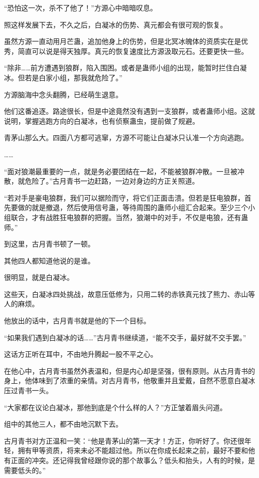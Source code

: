 \begin{this_body}
“恐怕这一次，杀不了他了！”方源心中暗暗叹息。

照这样发展下去，不久之后，白凝冰的伤势、真元都会有很可观的恢复。

虽然方源一直动用月芒蛊，追加他身上的伤势，但是北冥冰魄体的资质实在是优秀，简直可以说是得天独厚。真元的恢复速度比方源汲取元石。还要更快一些。

“除非……前方遭遇到狼群，陷入围困。或者是蛊师小组的出现，能暂时拦住白凝冰。但若是白家小组，那我就危险了。”

方源脑海中念头翻腾，已经萌生退意。

他们这番追逐。路途很长，但是中途竟然没有遇到一支狼群，或者蛊师小组。这就说明，掌握逃跑方向的白凝冰，也有侦察蛊虫，提前做了规避。

青茅山那么大。四面八方都可逃窜，方源不可能让白凝冰只认准一个方向逃跑。

……

“面对狼潮最重要的一点，就是务必要团结在一起，不能被狼群冲散。一旦被冲散，就危险了。”古月青书一边赶路，一边对身边的方正关照道。

“若对手是豪电狼群，我们可以据险而守，将它们正面击溃。但若是狂电狼群，首先要做的就是撤退，然后使用信号蛊，等待周围的蛊师小组汇合起来。至少三个小组联合，才有战胜狂电狼群的把握。当然，狼潮中的对手，不仅是电狼，还有蛊师。”

到这里，古月青书顿了一顿。

其他四人都知道他说的是谁。

很明显，就是白凝冰。

这些天，白凝冰四处挑战，故意压低修为，只用二转的赤铁真元找了熊力、赤山等人的麻烦。

他放出的话中，古月青书就是他的下一个目标。

“如果我们遇到白凝冰的话……”古月青书继续道，“能不交手，最好就不交手罢。”

这话方正听在耳中，不由地升腾起一股不平之心。

在他心中，古月青书虽然外表温和，但是内心却是坚强，很有原则。从古月青书的身上，他体味到了浓重的亲情。对古月青书，他敬重并且爱戴，自然不愿意白凝冰压过青书一头。

“大家都在议论白凝冰，那他到底是个什么样的人？”方正皱着眉头问道。

组中的其他三人，都不由地沉默下去。

古月青书对方正温和一笑：“他是青茅山的第一天才！方正，你听好了。你还很年轻，拥有甲等资质，将来未必不能超过他。所以在你成长起来之前，最好不要和他有正面的冲突。还记得我曾经跟你说的那个故事么？低头和抬头，人有的时候，是需要低头的。”


\end{this_body}
